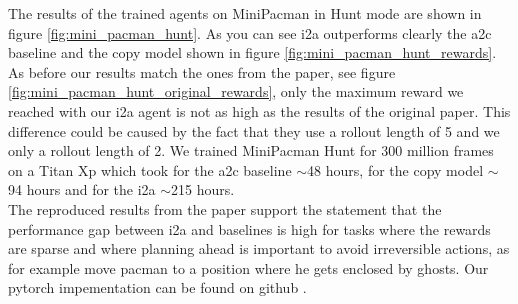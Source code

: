 The results of the trained agents on MiniPacman in Hunt mode are shown in figure \ref{fig:mini_pacman_hunt}. As you can see i2a outperforms clearly the a2c baseline and the copy model shown in figure \ref{fig:mini_pacman_hunt_rewards}.
As before our results match the ones from the paper, see figure \ref{fig:mini_pacman_hunt_original_rewards}, only the maximum reward we reached with our i2a agent is not as high as the results of the original paper.
This difference could be caused by the fact that they use a rollout length of 5 and we only a rollout length of 2.
We trained MiniPacman Hunt for 300 million frames on a Titan Xp  which took for the a2c baseline $\sim$48 hours, for the copy model $\sim$94 hours and for the i2a $\sim$215 hours.\\ 


The reproduced results from the paper support the statement that the performance gap between i2a and baselines is high for tasks where the rewards are sparse and where planning ahead is important to avoid irreversible actions, as for example move pacman to a position where he gets enclosed by ghosts.
Our pytorch impementation can be found on github \cite{repo}.




